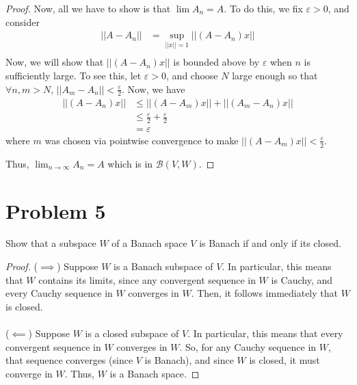 \documentclass[fontsize=11pt]{scrartcl} %
\numberwithin{equation}{section} %
\numberwithin{figure}{section} %
\numberwithin{table}{section} %
\begin{document}
\begin{proof}
    Now, all we have to show is that $\lim A_n = A$. To do this,
    we fix $\varepsilon > 0$, and consider
    \[
        \begin{aligned}
            ||A-A_n|| &= \sup_{||x||=1} ||(A-A_n)x||\\
        \end{aligned}
    \]
    Now, we will show that $||(A-A_n)x||$ is bounded above by $\varepsilon$ when
    $n$ is sufficiently large. To see this, let $\varepsilon > 0$, and choose
    $N$ large enough so that $\forall n,m>N$, $||A_m-A_n||<\frac{\varepsilon}{2}$.
    Now, we have 
    \[
        \begin{aligned}
            ||(A-A_n)x|| &\leq ||(A-A_m)x|| + ||(A_m-A_n)x||\\
                        &\leq \frac{\varepsilon}{2} + \frac{\varepsilon}{2}\\
                        &=\varepsilon
        \end{aligned}
    \]
    where $m$ was chosen via pointwise convergence to make
    $||(A-A_m)x||<\frac{\varepsilon}{2}$.

    Thus, $\lim_{n\to\infty}A_n = A$ which is in $\mathscr{B}(V,W)$.
\end{proof}
\newpage
\section*{Problem 5}
Show that a subspace $W$ of a Banach space $V$ is Banach if and only if its
closed.
\\
\begin{proof}
    ($\implies$)
    Suppose $W$ is a Banach subspace of $V$. In particular, this means that $W$
    contains its limits, since any convergent sequence in $W$ is Cauchy, and
    every Cauchy sequence in $W$ converges in $W$. Then, it follows immediately
    that $W$ is closed.
    \\
    \\
    ($\impliedby$)
    Suppose $W$ is a closed subspace of $V$. In particular, this means that
    every convergent sequence in $W$ converges in $W$. So, for any Cauchy
    sequence in $W$, that sequence converges (since $V$ is Banach), and since
    $W$ is closed, it must converge in $W$. Thus, $W$ is a Banach space.
\end{proof}
\newpage
\end{document}
